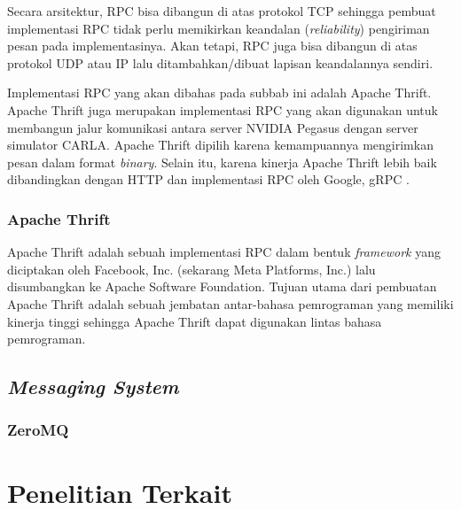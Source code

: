 Secara arsitektur, RPC bisa dibangun di atas protokol TCP sehingga pembuat
implementasi RPC tidak perlu memikirkan keandalan (\textit{reliability})
pengiriman pesan pada implementasinya. Akan tetapi, RPC juga bisa dibangun di
atas protokol UDP atau IP lalu ditambahkan/dibuat lapisan keandalannya sendiri.

Implementasi RPC yang akan dibahas pada subbab ini adalah Apache Thrift. Apache
Thrift juga merupakan implementasi RPC yang akan digunakan untuk membangun jalur
komunikasi antara server NVIDIA Pegasus dengan server simulator CARLA. Apache
Thrift dipilih karena kemampuannya mengirimkan pesan dalam format
\textit{binary}. Selain itu, karena kinerja Apache Thrift lebih baik
dibandingkan dengan HTTP dan implementasi RPC oleh Google, gRPC
\parencite{abernethy_buildingHighPerformanceMSThrift}.

\subsubsection{Apache Thrift}

Apache Thrift adalah sebuah implementasi RPC dalam bentuk \textit{framework}
yang diciptakan oleh Facebook, Inc. (sekarang Meta Platforms, Inc.) lalu
disumbangkan ke Apache Software Foundation. Tujuan utama dari pembuatan Apache
Thrift adalah sebuah jembatan antar-bahasa pemrograman yang memiliki kinerja
tinggi \parencite{agarwal_thrift} sehingga Apache Thrift dapat digunakan lintas
bahasa pemrograman.

\subsection{\textit{Messaging System}}

\subsubsection{ZeroMQ}

\section{Penelitian Terkait}
\blindtext